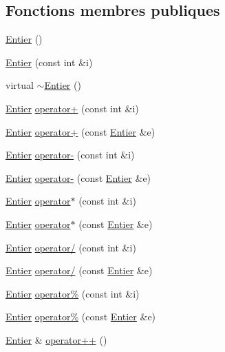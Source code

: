 \subsection*{Fonctions membres publiques}
\begin{DoxyCompactItemize}
\item 
\hyperlink{class_entier_a1e2d7505c454b85ef1201dd48b794812}{Entier} ()
\item 
\hyperlink{class_entier_aeb4c79c0bcc38ccc9c5a1ad043803b2b}{Entier} (const int \&i)
\item 
virtual \hyperlink{class_entier_af31cb8d422ea697a4e0209bb901272ad}{$\sim$\-Entier} ()
\item 
\hyperlink{class_entier}{Entier} \hyperlink{class_entier_a3fbb1809ad562b0008ab2352a15099a6}{operator+} (const int \&i)
\item 
\hyperlink{class_entier}{Entier} \hyperlink{class_entier_a8282ad9ab4575ab6b9133b0cb1735937}{operator+} (const \hyperlink{class_entier}{Entier} \&e)
\item 
\hyperlink{class_entier}{Entier} \hyperlink{class_entier_aced3c660e95f5986b5332f35dab8c582}{operator-\/} (const int \&i)
\item 
\hyperlink{class_entier}{Entier} \hyperlink{class_entier_adac2059d0b47ad800e6720472f2e3bfe}{operator-\/} (const \hyperlink{class_entier}{Entier} \&e)
\item 
\hyperlink{class_entier}{Entier} \hyperlink{class_entier_a256b2fe208f9213b4de99c028354eb58}{operator$\ast$} (const int \&i)
\item 
\hyperlink{class_entier}{Entier} \hyperlink{class_entier_aaf553e13bb7888e9ab67744bdfce7839}{operator$\ast$} (const \hyperlink{class_entier}{Entier} \&e)
\item 
\hyperlink{class_entier}{Entier} \hyperlink{class_entier_a1aeb57f0c3b07a045f5f51d7d581efb9}{operator/} (const int \&i)
\item 
\hyperlink{class_entier}{Entier} \hyperlink{class_entier_a08f1ccbb12ca08e195c7cf98e9d749bd}{operator/} (const \hyperlink{class_entier}{Entier} \&e)
\item 
\hyperlink{class_entier}{Entier} \hyperlink{class_entier_a9a8ee8f74ab48a1eff0495788e811b68}{operator\%} (const int \&i)
\item 
\hyperlink{class_entier}{Entier} \hyperlink{class_entier_a634aaf924535952927e4a37a32f43be4}{operator\%} (const \hyperlink{class_entier}{Entier} \&e)
\item 
\hyperlink{class_entier}{Entier} \& \hyperlink{class_entier_a755888e1158fa05b5abb52b77d3b0b7d}{operator++} ()

\end{DoxyCompactItemize}
